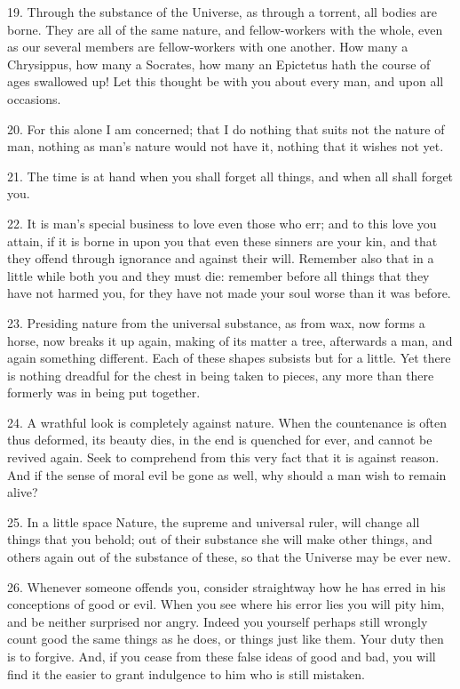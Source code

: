 \documentclass{book}
\begin{document}
\newpage

19. Through the substance of the Universe, as through a torrent, all
bodies are borne. They are all of the same nature, and fellow-workers
with the whole, even as our several members are fellow-workers with
one another. How many a Chrysippus, how many a Socrates, how many an
Epictetus hath the course of ages swallowed up! Let this thought be
with you about every man, and upon all occasions.

20. For this alone I am concerned; that I do nothing that suits not
the nature of man, nothing as man's nature would not have it, nothing
that it wishes not yet.

21. The time is at hand when you shall forget all things, and when all
shall forget you.

22. It is man's special business to love even those who err; and to
this love you attain, if it is borne in upon you that even these
sinners are your kin, and that they offend through ignorance and
against their will. Remember also that in a little while both you and
they must die: remember before all things that they have not harmed
you, for they have not made your soul worse than it was before.

23. Presiding nature from the universal substance, as from wax, now
forms a horse, now breaks it up again, making of its matter a tree,
afterwards a man, and again something different. Each of these shapes
subsists but for a little. Yet there is nothing dreadful for the chest
in being taken to pieces, any more than there formerly was in being
put together.

24. A wrathful look is completely against nature. When the countenance
is often thus deformed, its beauty dies, in the end is quenched for
ever, and cannot be revived again. Seek to comprehend from this very
fact that it is against reason. And if the sense of moral evil be gone
as well, why should a man wish to remain alive?

25. In a little space Nature, the supreme and universal ruler, will
change all things that you behold; out of their substance she will
make other things, and others again out of the substance of these, so
that the Universe may be ever new.

26. Whenever someone offends you, consider straightway how he has
erred in his conceptions of good or evil. When you see where his error
lies you will pity him, and be neither surprised nor angry. Indeed you
yourself perhaps still wrongly count good the same things as he does,
or things just like them. Your duty then is to forgive. And, if you
cease from these false ideas of good and bad, you will find it the
easier to grant indulgence to him who is still mistaken.
\end{document}

